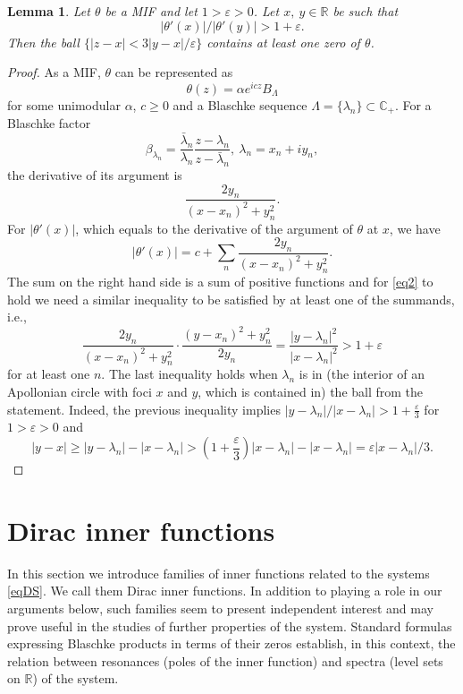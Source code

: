 \documentclass[11pt,twoside,reqno]{amsart}
\def\R{{\mathbb R}}
\def\C{{\mathbb{C}}}
\def\e{\varepsilon}
\def\L{\Lambda}
\def\l{\lambda}
\def\a{\alpha}
\def\b{\beta}
\def\lan{\lambda_n}
\theoremstyle{plain}
\newtheorem{lemma}{Lemma}
\numberwithin{equation}{section}
\begin{document}

\begin{lemma} \label{lemInner} Let $\theta$ be a MIF and let $1>\e>0$. Let $x,\ y\in\R$ be such that
\begin{equation}|\theta '(x)|/|\theta'(y)|>1+\e.\label{eq2}\end{equation}
Then  the
ball $\{|z-x|<3|y-x|/\e\}$
contains at least one zero of $\theta$.


\end{lemma}


\begin{proof}
As a MIF, $\theta$ can be represented as
$$\theta(z)=\a e^{icz}B_\L$$
for some unimodular $\a$, $c\geq 0$ and a Blaschke sequence $\L=\{\lan\}\subset \C_+$.
For a Blaschke factor
$$\b_{\lan}=\frac{\bar \l_n}{\lan}\frac{z-\lan}{z-\bar\l_n},\ \lan=x_n+iy_n,$$
the derivative
	of its argument is
$$\frac {2y_n}{(x-x_n)^2+y_n^2}.$$
For $|\theta'(x)|$, which equals to the derivative of the  argument of $\theta$ at $x$, we have	
	$$|\theta'(x)|= c+\sum_n  \frac {2y_n}{(x-x_n)^2+y_n^2}.$$
The sum on the right hand side is a sum of positive functions and for \eqref{eq2} to hold we need a similar
inequality to be satisfied by at least one of the summands, i.e.,
$$\frac {2y_n}{(x-x_n)^2+y_n^2}\cdot\frac {(y-x_n)^2+y_n^2}{2y_n}=\frac{|y-\lan|^2}{|x-\lan|^2}>1+\e
$$
for at least one $n$. The last inequality holds when $\lan$ is in (the interior of an Apollonian circle with foci $x$ and $y$, which is contained in) the ball from the statement. Indeed,
the previous inequality implies $|y-\lan|/|x-\lan|>1+\frac\e 3$
for $1>\e>0$ and 
$$|y-x|\geq |y-\lan| -|x-\lan|>\left(1+\frac\e 3\right)|x-\lan|-|x-\lan|=\e|x-\lan|/3.$$
\end{proof}


\section{Dirac inner functions}\label{secDIF}

In this section we introduce families of inner functions related to the systems \eqref{eqDS}. We call them
Dirac inner functions. In addition to playing a role in our arguments below, such families seem to present
independent interest and may prove useful in the studies of further properties of the system. Standard formulas
expressing Blaschke products in terms of their zeros establish, in this context, the relation between resonances
 (poles of the inner function) and spectra (level sets on $\R$) of the system.
\end{document}
